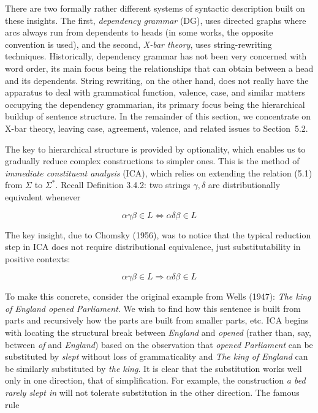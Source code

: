 There are two formally rather different systems of syntactic description built
on these insights. The first, {\it dependency grammar} (DG), uses directed
graphs where arcs always run from dependents to heads (in some works, the
opposite convention is used), and the second, {\it X-bar theory}, uses
string-rewriting techniques. Historically, dependency grammar has not been
very concerned with word order, its main focus being the relationships that
can obtain between a head and its dependents. String rewriting, on the other
hand, does not really have the apparatus to deal with grammatical function,
valence, case, and similar matters occupying the dependency grammarian, its
primary focus being the hierarchical buildup of sentence structure. In the
remainder of this section, we concentrate on X-bar theory, leaving case,
agreement, valence, and related issues to Section~5.2.

The key to hierarchical structure is provided by optionality, which enables us
to gradually reduce complex constructions to simpler ones. This is the method
of {\it immediate constituent analysis} (ICA),   
which relies on extending the relation
(5.1) from $\Sigma$ to $\Sigma^*$.  Recall Definition 3.4.2: two strings
$\gamma, \delta$ are distributionally equivalent whenever

\begin{equation}
\alpha \gamma \beta \in L \Leftrightarrow \alpha \delta \beta \in L
\end{equation}

\noindent 
The key insight, due to Chomsky (1956), was to notice that the typical
reduction step in ICA does not require distributional equivalence, just
substitutability in positive contexts:

\begin{equation}
\alpha \gamma \beta \in L \Rightarrow \alpha \delta \beta \in L
\end{equation}

\noindent 
To make this concrete, consider the original example from Wells (1947): {\it
  The king of England opened Parliament}.\nocite{Wells:1947} We wish to find
how this sentence is built from parts and recursively how the parts are built
from smaller parts, etc. ICA begins with locating the structural break between
{\it England} and {\it opened} (rather than, say, between {\it of} and {\it
  England}) based on the observation that {\it opened Parliament} can be
substituted by {\it slept} without loss of grammaticality and {\it The king of
  England} can be similarly substituted by {\it the king}. It is clear that
the substitution works well only in one direction, that of simplification. For
example, the construction {\it a bed rarely slept in} will not tolerate
substitution in the other direction.  The famous rule

